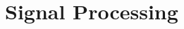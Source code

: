 \documentclass[../computational_physics.tex]{subfiles}
\begin{document}
    \section{Signal Processing}



\end{document}
